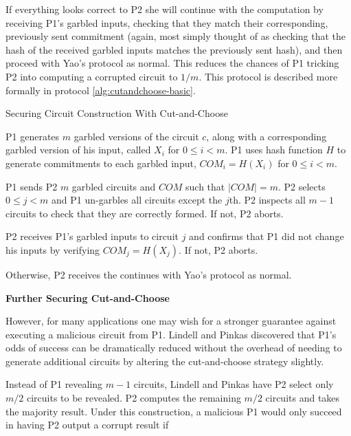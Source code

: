 If everything looks correct to \ac{P2} she will continue with the computation by receiving \ac{P1}'s garbled inputs, checking that they match their corresponding, previously sent commitment (again, most simply thought of as checking that the hash of the received garbled inputs matches the previously sent hash), and then proceed with Yao's protocol as normal. This reduces the chances of \ac{P1} tricking \ac{P2} into computing a corrupted circuit to $1/m$. This protocol is described more formally in protocol \ref{alg:cutandchoose-basic}.

\begin{algorithm}[H]
    \caption{Securing Circuit Construction With Cut-and-Choose}
    \label{alg:cutandchoose-basic}
    \begin{algorithmic}[1]
        \STATE \ac{P1} generates $m$ garbled versions of the circuit $c$, along with a corresponding garbled version of his input, called $X_i$ for $0 \leq i < m$.
        \STATE \ac{P1} uses hash function $H$ to generate commitments to each garbled input, $COM_i = H(X_i)$ for $0 \leq i < m$.

        \STATE \ac{P1} sends \ac{P2} $m$ garbled circuits and $COM$ such that $|COM| = m$.
        \STATE \ac{P2} selects $0 \leq j < m$ and \ac{P1} un-garbles all circuits except the $j$th.
        \STATE \ac{P2} inspects all $m-1$ circuits to check that they are correctly formed. If not, \ac{P2} aborts.

        \STATE \ac{P2} receives \ac{P1}'s garbled inputs to circuit $j$ and confirms that \ac{P1} did not change his inputs by verifying $COM_j = H(X_j)$. If not, \ac{P2} aborts.

        \STATE Otherwise, \ac{P2} receives the continues with Yao's protocol as normal.
    \end{algorithmic}
\end{algorithm}


\noindent\textbf{Further Securing Cut-and-Choose}

However, for many applications one may wish for a stronger guarantee against executing a malicious circuit from \ac{P1}.  Lindell and Pinkas\cite{lindell2007efficient} discovered that \ac{P1}'s odds of success can be dramatically reduced without the overhead of needing to generate additional circuits by altering the cut-and-choose strategy slightly.

Instead of \ac{P1} revealing $m-1$ circuits, Lindell and Pinkas have \ac{P2} select only $m/2$ circuits to be revealed.  \ac{P2} computes the remaining $m/2$ circuits and takes the majority result. Under this construction, a malicious \ac{P1} would only succeed in having \ac{P2} output a corrupt result if


